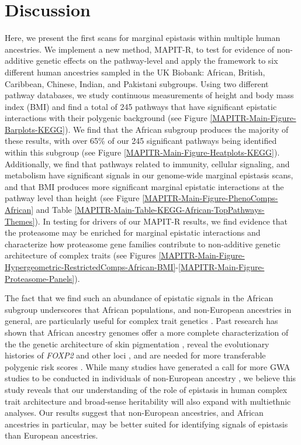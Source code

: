 \documentclass[10pt]{article}
\begin{document}

\section*{Discussion}\label{MAPITR-Discussion}

Here, we present the first scans for marginal epistasis within multiple human ancestries. We implement a new method, MAPIT-R, to test for evidence of non-additive genetic effects on the pathway-level and apply the framework to six different human ancestries sampled in the UK Biobank: African, British, Caribbean, Chinese, Indian, and Pakistani subgroups. Using two different pathway databases, we study continuous measurements of height and body mass index (BMI) and find a total of 245 pathways that have significant epistatic interactions with their polygenic background (see Figure \ref{MAPITR-Main-Figure-Barplots-KEGG}). We find that the African subgroup produces the majority of these results, with over 65\% of our 245 significant pathways being identified within this subgroup (see Figure \ref{MAPITR-Main-Figure-Heatplots-KEGG}). Additionally, we find that pathways related to immunity, cellular signaling, and metabolism have significant signals in our genome-wide marginal epistasis scans, and that BMI produces more significant marginal epistatic interactions at the pathway level than height (see Figure \ref{MAPITR-Main-Figure-PhenoComps-African} and Table \ref{MAPITR-Main-Table-KEGG-African-TopPathways-Themes}). In testing for drivers of our MAPIT-R results, we find evidence that the proteasome may be enriched for marginal epistatic interactions and characterize how proteasome gene families contribute to non-additive genetic architecture of complex traits (see Figures \ref{MAPITR-Main-Figure-Hypergeometric-RestrictedComps-African-BMI}-\ref{MAPITR-Main-Figure-Proteasome-Panels}). 

The fact that we find such an abundance of epistatic signals in the African subgroup underscores that African populations, and non-European ancestries in general, are particularly useful for complex trait genetics \cite{Dumitrescu2011,Rotimi2017,Choudhury2018,Martin2018,Mogil2018,Bien2019,Kuchenbaecker2019,Wojcik2019,Zhong2019,Bentley2020}. Past research has shown that African ancestry genomes offer a more complete characterization of the the genetic architecture of skin pigmentation \cite{Martin2017b,Crawford2017b}, reveal the evolutionary histories of \textit{FOXP2} and other loci \cite{Atkinson2018,Sugden2018}, and are needed for more transferable polygenic risk scores \cite{Duncan2019,Marnetto2020}. While many studies have generated a call for more GWA studies to be conducted in individuals of non-European ancestry  \cite{Need2009,Popejoy2016,Gurdasani2019,Martin2019,Sirugo2019}, we believe this study reveals that our understanding of the role of epistasis in human complex trait architecture and broad-sense heritability will also expand with multiethnic analyses. Our results suggest that non-European ancestries, and African ancestries in particular, may be better suited for identifying signals of epistasis than European ancestries. 
\end{document}

